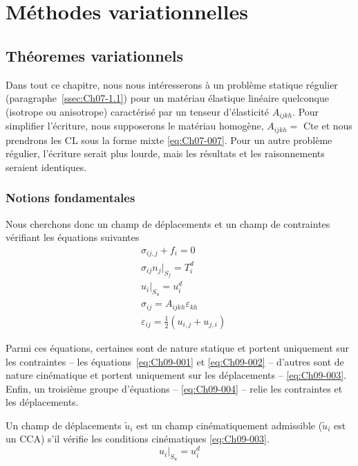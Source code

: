 \chapter{Méthodes variationnelles} \label{chap:09}
\section{Théoremes variationnels} \label{sec:Ch09-1}
Dans tout ce chapitre, nous nous intéresserons à un problème statique régulier (paragraphe~\ref{ssec:Ch07-1.1}) pour un matériau élastique linéaire quelconque (isotrope ou anisotrope) caractérisé par un tenseur d'élasticité $A_{ijkh}$.
Pour simplifier l'écriture, nous supposerons le matériau homogène, $A_{ijkh} =$ Cte et nous prendrons les CL sous la forme mixte \eqref{eq:Ch07-007}.
Pour un autre problème régulier, l'écriture serait plus lourde, mais les résultats et les raisonnements seraient identiques.

\subsection{Notions fondamentales} \label{ssec:Ch09-1.1}
Nous cherchons donc un champ de déplacements et un champ de contraintes vérifiant les équations suivantes
\begin{align}
    & \sigma_{ij,j} + f_i = 0 \label{eq:Ch09-001} \\
    & \sigma_{ij} n_j |_{S_f} = T_i^d \label{eq:Ch09-002} \\
    & u_i |_{S_u} = u_i^d \label{eq:Ch09-003} \\
    & \sigma_{ij} = A_{ijkh} \varepsilon_{kh} \label{eq:Ch09-004} \\
    & \varepsilon_{ij} = \frac{1}{2} \left( u_{i,j} + u_{j,i} \right) \label{eq:Ch09-005}
\end{align}

Parmi ces équations, certaines sont de nature statique et portent uniquement sur les contraintes -- les équations~\eqref{eq:Ch09-001} et \eqref{eq:Ch09-002} -- d'autres sont de  nature cinématique  et portent uniquement  sur  les déplacements -- \eqref{eq:Ch09-003}.  
Enfin, un troisième groupe d'équations -- \eqref{eq:Ch09-004} -- relie les contraintes et les déplacements.

\begin{deff}
    Un champ de déplacements $\tilde{u}_i$ est un champ cinématiquement admissible ($\tilde{u}_i$ est un CCA) s'il vérifie les conditions cinématiques \eqref{eq:Ch09-003}.
    \begin{equation}
        u_i |_{S_u} = u_i^d
        \label{eq:Ch09-006}
    \end{equation}
\end{deff}

